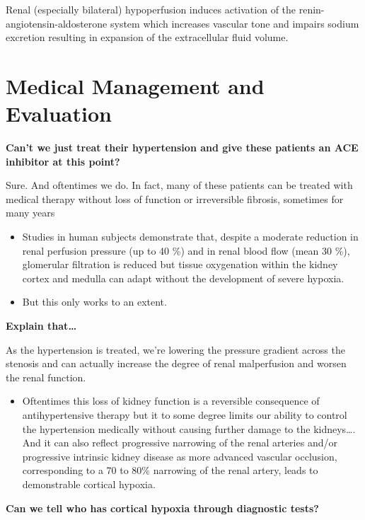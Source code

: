 \documentclass[
]{book}
\providecommand{\tightlist}{%
  \setlength{\itemsep}{0pt}\setlength{\parskip}{0pt}}
\begin{document}
Renal (especially bilateral) hypoperfusion induces activation of the
renin-angiotensin-aldosterone system which increases vascular tone and
impairs sodium excretion resulting in expansion of the extracellular
fluid volume.

\hypertarget{medical-management-and-evaluation}{%
\section{Medical Management and Evaluation}\label{medical-management-and-evaluation}}

\textbf{Can't we just treat their hypertension and give these patients an ACE
inhibitor at this point?}

Sure. And oftentimes we do. In fact, many of these patients can be
treated with medical therapy without loss of function or irreversible
fibrosis, sometimes for many years

\begin{itemize}
\item
  Studies in human subjects demonstrate that, despite a moderate
  reduction in renal perfusion pressure (up to 40 \%) and in renal
  blood flow (mean 30 \%), glomerular filtration is reduced but tissue
  oxygenation within the kidney cortex and medulla can adapt without
  the development of severe hypoxia.
\item
  But this only works to an extent.
\end{itemize}

\textbf{Explain that\ldots{}}

As the hypertension is treated, we're lowering the pressure gradient
across the stenosis and can actually increase the degree of renal
malperfusion and worsen the renal function.

\begin{itemize}
\tightlist
\item
  Oftentimes this loss of kidney function is a reversible consequence
  of antihypertensive therapy but it to some degree limits our ability
  to control the hypertension medically without causing further damage
  to the kidneys\ldots. And it can also reflect progressive narrowing of
  the renal arteries and/or progressive intrinsic kidney disease as
  more advanced vascular occlusion, corresponding to a 70 to 80\%
  narrowing of the renal artery, leads to demonstrable cortical
  hypoxia.
\end{itemize}

\textbf{Can we tell who has cortical hypoxia through diagnostic tests?}
\end{document}
